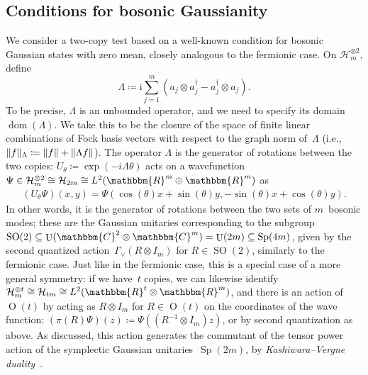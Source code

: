 \documentclass[11pt,a4paper]{article}
\numberwithin{equation}{section}
\newcommand{\ot}{\otimes}
\newcommand{\op}{\oplus}
\newcommand{\RR}{\mathbbm{R}}
\newcommand{\CC}{\mathbbm{C}}
\newcommand{\HH}{\mathcal{H}}
\newcommand{\1}{\mathbf{1}}
\DeclareMathOperator{\dom}{dom}
\DeclareMathOperator{\Sp}{Sp}
\DeclareMathOperator{\SO}{SO}
\DeclareMathOperator{\Ortho}{O}
\DeclareMathOperator{\U}{U}
\DeclarePairedDelimiter\norm{\lVert}{\rVert}
\begin{document}
\subsection{Conditions for bosonic Gaussianity}\label{sub:conditions_for_bosonic_gaussianity}
We consider a two-copy test based on a well-known condition for bosonic Gaussian states with zero mean, closely analogous to the fermionic case.
On $\HH_m^{\ot 2}$, define
\begin{equation*}
    \Lambda \coloneqq \mathrm{i} \sum_{j=1}^m \left( a_j \ot a_j^\dagger - a_j^\dagger \ot a_j \right).
\end{equation*}
To be precise, $\Lambda$ is an unbounded operator, and we need to specify its domain~$\dom(\Lambda)$.
We take this to be the closure of the space of finite linear combinations of Fock basis vectors with respect to the graph norm of~$\Lambda$ (i.e., $\norm{f}_{\Lambda} \coloneqq \norm{f} + \norm{\Lambda f}$).
The operator $\Lambda$ is the generator of rotations between the two copies: $U_\theta \coloneqq \exp(-i \Lambda \theta)$ acts on a wavefunction $\Psi \in \HH_m^{\ot 2} \cong \HH_{2m} \cong L^2(\RR^m \op \RR^m)$ as
\begin{align}\label{eq:U-theta}
    (U_\theta \Psi)(x,y) = \Psi(\cos(\theta)x + \sin(\theta)y, -\sin(\theta)x + \cos(\theta) y).
\end{align}
In other words, it is the generator of rotations between the two sets of $m$~bosonic modes;
these are the Gaussian unitaries corresponding to the subgroup $\SO(2) \subseteq \U(\CC^2 \ot \CC^m) = \U(2m) \subseteq \Sp(4m)$, given by the second quantized action~$\Gamma_\vee(R \ot I_m)$ for $R \in \SO(2)$, similarly to the fermionic case.
Just like in the fermionic case, this is a special case of a more general symmetry: if we have~$t$ copies, we can likewise identify $\HH_m^{\ot t} \cong \HH_{tm} \cong L^2(\RR^t \ot \RR^m)$, and there is an action of $\Ortho(t)$ by acting as $R \ot I_m$ for $R \in \Ortho(t)$ on the coordinates of the wave function: $(\pi(R)\Psi)(z) \coloneqq \Psi((R^{-1} \ot I_m)z)$, or by second quantization as above.
As discussed, this action generates the commutant of the tensor power action of the symplectic Gaussian unitaries~$\Sp(2m)$, by \emph{Kashiwara--Vergne duality}~\cite{kashiwara1978segal}.
\end{document}
